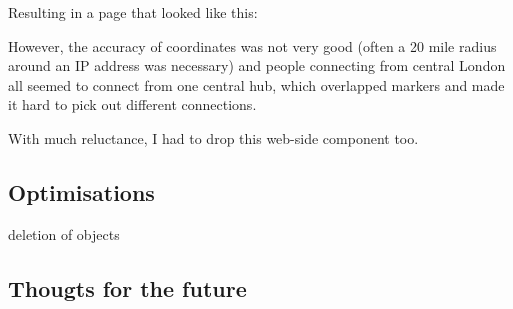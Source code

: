 \documentclass[11pt]{article} %
\begin{document}
Resulting in a page that looked like this:

However, the accuracy of coordinates was not very good (often a 20 mile radius around an IP address was necessary) and people connecting from central London all seemed to connect from one central hub, which overlapped markers and made it hard to pick out different connections.

With much reluctance, I had to drop this web-side component too.

\subsection{Optimisations}
deletion of objects
\subsection{Thougts for the future}
\end{document}
